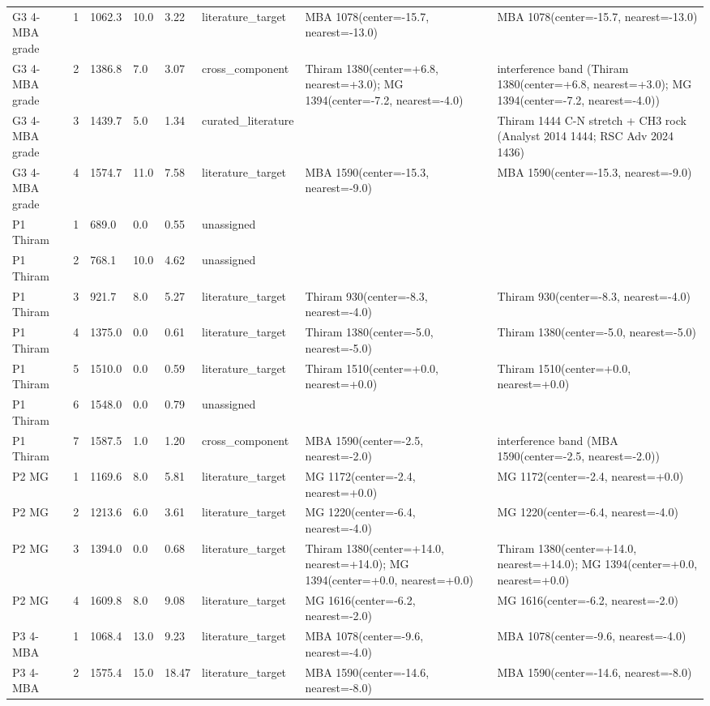 {\begin{longtable}{L{2.1cm}L{1.0cm}L{1.25cm}L{1.0cm}L{1.1cm}L{2.0cm}L{2.2cm}L{3.8cm}}
G3 4-MBA grade & 1 & 1062.3 & 10.0 & 3.22 & literature\_target & MBA 1078(center=-15.7, nearest=-13.0) & MBA 1078(center=-15.7, nearest=-13.0) \\
G3 4-MBA grade & 2 & 1386.8 & 7.0 & 3.07 & cross\_component & Thiram 1380(center=+6.8, nearest=+3.0); MG 1394(center=-7.2, nearest=-4.0) & interference band (Thiram 1380(center=+6.8, nearest=+3.0); MG 1394(center=-7.2, nearest=-4.0)) \\
G3 4-MBA grade & 3 & 1439.7 & 5.0 & 1.34 & curated\_literature &  & Thiram 1444 C-N stretch + CH3 rock (Analyst 2014 1444; RSC Adv 2024 1436) \\
G3 4-MBA grade & 4 & 1574.7 & 11.0 & 7.58 & literature\_target & MBA 1590(center=-15.3, nearest=-9.0) & MBA 1590(center=-15.3, nearest=-9.0) \\
P1 Thiram & 1 & 689.0 & 0.0 & 0.55 & unassigned &  &  \\
P1 Thiram & 2 & 768.1 & 10.0 & 4.62 & unassigned &  &  \\
P1 Thiram & 3 & 921.7 & 8.0 & 5.27 & literature\_target & Thiram 930(center=-8.3, nearest=-4.0) & Thiram 930(center=-8.3, nearest=-4.0) \\
P1 Thiram & 4 & 1375.0 & 0.0 & 0.61 & literature\_target & Thiram 1380(center=-5.0, nearest=-5.0) & Thiram 1380(center=-5.0, nearest=-5.0) \\
P1 Thiram & 5 & 1510.0 & 0.0 & 0.59 & literature\_target & Thiram 1510(center=+0.0, nearest=+0.0) & Thiram 1510(center=+0.0, nearest=+0.0) \\
P1 Thiram & 6 & 1548.0 & 0.0 & 0.79 & unassigned &  &  \\
P1 Thiram & 7 & 1587.5 & 1.0 & 1.20 & cross\_component & MBA 1590(center=-2.5, nearest=-2.0) & interference band (MBA 1590(center=-2.5, nearest=-2.0)) \\
P2 MG & 1 & 1169.6 & 8.0 & 5.81 & literature\_target & MG 1172(center=-2.4, nearest=+0.0) & MG 1172(center=-2.4, nearest=+0.0) \\
P2 MG & 2 & 1213.6 & 6.0 & 3.61 & literature\_target & MG 1220(center=-6.4, nearest=-4.0) & MG 1220(center=-6.4, nearest=-4.0) \\
P2 MG & 3 & 1394.0 & 0.0 & 0.68 & literature\_target & Thiram 1380(center=+14.0, nearest=+14.0); MG 1394(center=+0.0, nearest=+0.0) & Thiram 1380(center=+14.0, nearest=+14.0); MG 1394(center=+0.0, nearest=+0.0) \\
P2 MG & 4 & 1609.8 & 8.0 & 9.08 & literature\_target & MG 1616(center=-6.2, nearest=-2.0) & MG 1616(center=-6.2, nearest=-2.0) \\
P3 4-MBA & 1 & 1068.4 & 13.0 & 9.23 & literature\_target & MBA 1078(center=-9.6, nearest=-4.0) & MBA 1078(center=-9.6, nearest=-4.0) \\
P3 4-MBA & 2 & 1575.4 & 15.0 & 18.47 & literature\_target & MBA 1590(center=-14.6, nearest=-8.0) & MBA 1590(center=-14.6, nearest=-8.0) \\
\end{longtable}
}


